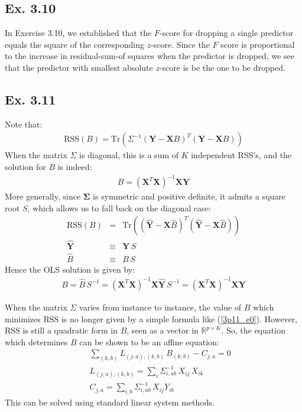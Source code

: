 \subsection*{Ex. 3.10}
In Exercise 3.10, we established that the $F$-score for dropping a single predictor equals the square
of the corresponding $z$-score. Since the $F$ score is proportional to the increase in residual-sum-of 
squares when the predictor is dropped, we see that the predictor with smallest absolute $z$-score is be the one to be dropped.

\subsection*{Ex. 3.11}
Note that:
\begin{eqnarray*}
\textrm{RSS}(B) = \textrm{Tr} \left(\Sigma^{-1} \left( \mathbf{Y} - \mathbf{X} B \right)^T \left( \mathbf{Y} - \mathbf{X} B \right)\right)
\end{eqnarray*}
When the matrix $\Sigma$ is diagonal, this is a sum of $K$ independent RSS's, and the solution for
$B$ is indeed:
\begin{eqnarray} \label{3p11_e0}
B = \left( \mathbf{X} ^T \mathbf{X} \right)^{-1} \mathbf{X} \mathbf{Y}
\end{eqnarray}
More generally, since $\mathbf{\Sigma}$ is symmetric and positive definite, it admits a square root $S$, which allows us to fall back on the diagonal case:
\begin{eqnarray*}
\textrm{RSS}(B) & = & \textrm{Tr} \left(\left( \mathbf{\hat{Y}} - \mathbf{X} \hat{B} \right)^T \left( \mathbf{\hat{Y}} - \mathbf{X} \hat{B} \right)\right)\\
\mathbf{\hat{Y}} & \equiv &\mathbf{Y}\,S\\
\hat{B} & \equiv & B\, S
\end{eqnarray*}
Hence the OLS solution is given by:
\begin{eqnarray*}
B = \hat{B}\, S^{-1} = \left( \mathbf{X} ^T \mathbf{X} \right)^{-1} \mathbf{X} \hat{\mathbf{Y}} \, S^{-1} = \left( \mathbf{X} ^T \mathbf{X} \right)^{-1} \mathbf{X} \mathbf{Y}
\end{eqnarray*}

When the matrix $\Sigma$ varies from instance to instance, the value of $B$ which minimizes $\textrm{RSS}$
is no longer given by a simple formula like (\ref{3p11_e0}). However, $\textrm{RSS}$ is still a quadratic
form in $B$, seen as a vector in $\mathbb{R}^{p \times K}$. So, the equation which determines $B$ 
can be shown to be an affine equation:
\begin{eqnarray*}
&& \sum_{(k, b)} L_{(j, a), (k, b)} \, B_{(k, b)} - C_{j, a} = 0\\
&& L_{(j, a), (k, b)} = \sum_i \Sigma^{-1}_{i, ab} \, X_{ij}\, X_{ik}\\
&& C_{j, a} = \sum_{i, b} \Sigma^{-1}_{i, ab} \, X_{ij} Y_{ib}
\end{eqnarray*}
This can be solved using standard linear system methods.

